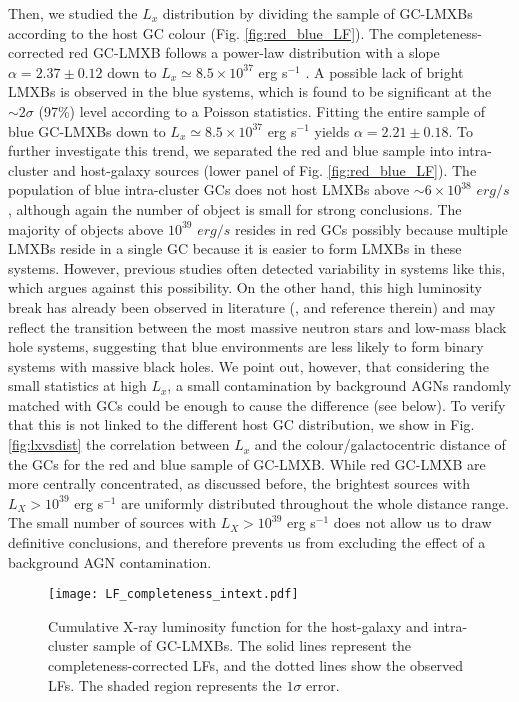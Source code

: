 \documentclass{aa}
\begin{document}
Then, we studied the $L_x$ distribution by dividing the sample of GC-LMXBs according to the host GC colour (Fig. \ref{fig:red_blue_LF}). The completeness-corrected red GC-LMXB follows a power-law distribution with a slope $\alpha=2.37 \pm 0.12$ down to $L_x\simeq 8.5\times 10^{37}$ erg s$^{-1}$ . A possible lack of bright LMXBs is observed in the blue systems, which is found to be significant at the $\sim 2\sigma$ (97\%) level according to a Poisson statistics. 
Fitting the entire sample of blue GC-LMXBs down to $L_x\simeq 8.5\times 10^{37}$ erg s$^{-1}$ yields $\alpha=2.21 \pm 0.18$.
To further investigate this trend, we separated the red and blue sample into intra-cluster and host-galaxy sources (lower panel of Fig. \ref{fig:red_blue_LF}). The population of blue intra-cluster GCs does not host LMXBs above $\sim 6\times 10^{38}$ $erg/s$, although again the number of object is small for strong conclusions. The majority of objects above $10^{39}$ $erg / s$ resides in red GCs possibly because multiple LMXBs reside in a single GC because it is easier to form LMXBs in these systems. However, previous studies often detected variability in systems like this, which argues against this possibility. On the other hand, this high luminosity break has already been observed in literature (\citealt{Fabbiano2006}, and reference therein) and may reflect the transition between the most massive neutron stars and low-mass black hole systems, suggesting that blue environments are less likely to form binary systems with massive black holes. We point out, however, that considering the small statistics at high $L_x$, a small contamination by background AGNs randomly matched with GCs could be enough to cause the difference (see below). To verify that this is not linked to the different host GC distribution, we show in Fig. \ref{fig:lxvsdist} the correlation between $L_x$ and the colour/galactocentric distance of the GCs  for the red and blue sample of GC-LMXB. While red GC-LMXB are more centrally concentrated, as discussed before, the brightest sources with $L_X>10^{39}$ erg s$^{-1}$ 
are uniformly distributed throughout the whole distance range. 
The small number of sources with $L_X>10^{39}$ erg s$^{-1}$ does not allow us to draw definitive conclusions, and therefore prevents us from excluding the effect of a background AGN contamination.


\begin{figure}[]
    \centering
    \texttt{[image: LF\_completeness\_intext.pdf]}
    \caption{ Cumulative X-ray luminosity function for the host-galaxy and intra-cluster sample of GC-LMXBs. The solid lines represent the completeness-corrected LFs, and the dotted lines show the observed LFs. The shaded region represents the $1\sigma$ error.}
    \label{fig:Lf}
\end{figure}
\end{document}
